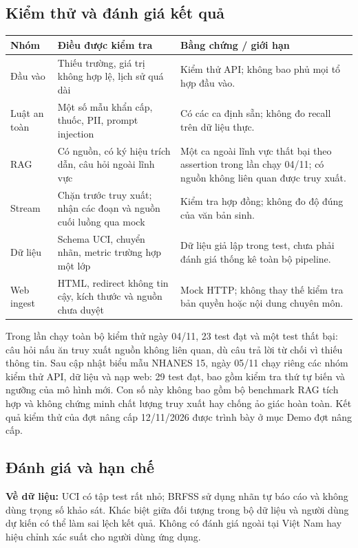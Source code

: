 \subsection{Kiểm thử và đánh giá kết quả}
\begin{longtable}{p{3.3cm}p{6.3cm}p{4.2cm}}\toprule
\textbf{Nhóm} & \textbf{Điều được kiểm tra} & \textbf{Bằng chứng / giới hạn}\\\midrule\endhead
Đầu vào & Thiếu trường, giá trị không hợp lệ, lịch sử quá dài & Kiểm thử API; không bao phủ mọi tổ hợp đầu vào.\\
Luật an toàn & Một số mẫu khẩn cấp, thuốc, PII, prompt injection & Có các ca định sẵn; không đo recall trên dữ liệu thực.\\
RAG & Có nguồn, có ký hiệu trích dẫn, câu hỏi ngoài lĩnh vực & Một ca ngoài lĩnh vực thất bại theo assertion trong lần chạy 04/11; có nguồn không liên quan được truy xuất.\\
Stream & Chặn trước truy xuất; nhận các đoạn và nguồn cuối luồng qua mock & Kiểm tra hợp đồng; không đo độ đúng của văn bản sinh.\\
Dữ liệu & Schema UCI, chuyển nhãn, metric trường hợp một lớp & Dữ liệu giả lập trong test, chưa phải đánh giá thống kê toàn bộ pipeline.\\
Web ingest & HTML, redirect không tin cậy, kích thước và nguồn chưa duyệt & Mock HTTP; không thay thế kiểm tra bản quyền hoặc nội dung chuyên môn.\\\bottomrule\end{longtable}
Trong lần chạy toàn bộ kiểm thử ngày 04/11, 23 test đạt và một test thất bại: câu hỏi nấu ăn truy xuất nguồn không liên quan, dù câu trả lời từ chối vì thiếu thông tin. Sau cập nhật biểu mẫu NHANES 15, ngày 05/11 chạy riêng các nhóm kiểm thử API, dữ liệu và nạp web: 29 test đạt, bao gồm kiểm tra thứ tự biến và ngưỡng của mô hình mới. Con số này không bao gồm bộ benchmark RAG tích hợp và không chứng minh chất lượng truy xuất hay chống ảo giác hoàn toàn. Kết quả kiểm thử của đợt nâng cấp 12/11/2026 được trình bày ở mục Demo đợt nâng cấp.
\subsection{Đánh giá và hạn chế}
\textbf{Về dữ liệu:} UCI có tập test rất nhỏ; BRFSS sử dụng nhãn tự báo cáo và không dùng trọng số khảo sát. Khác biệt giữa đối tượng trong bộ dữ liệu và người dùng dự kiến có thể làm sai lệch kết quả. Không có đánh giá ngoài tại Việt Nam hay hiệu chỉnh xác suất cho người dùng ứng dụng.


